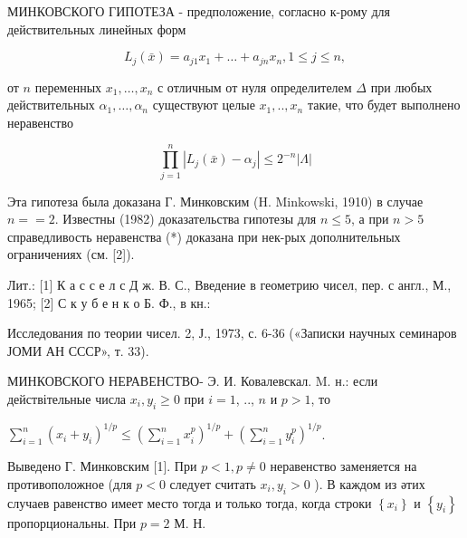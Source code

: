 \documentclass[10pt]{article}
\begin{document}
МИНКОВСКОГО ГИПОТЕЗА - предположение, согласно к-рому для действительных линейных форм



\[

L_{j}(\bar{x})=a_{j 1} x_{1}+\ldots+a_{j n} x_{n}, 1 \leqslant j \leqslant n,

\]



от $n$ переменных $x_{1}, \ldots, x_{n}$ с отличным от нуля определителем $\Delta$ при любых действительных $\alpha_{1}, \ldots, \alpha_{n}$ существуют целые $x_{1}, . ., x_{n}$ такие, что будет выполнено неравенство



\[

\prod_{j=1}^{n}\left|L_{j}(\bar{x})-\alpha_{j}\right| \leqslant 2^{-n}|\Lambda|

\]



Эта гипотеза была доказана Г. Минковским (H. Minkowski, 1910) в случае $n==2$. Известны (1982) доказательства гипотезы для $n \leqslant 5$, а при $n>5$ справедливость неравенства (*) доказана при нек-рых дополнительных ограничениях (см. [2]).



Лит.: [1] К а с с е л с Д ж. В. С., Введение в геометрию чисел, пер. с англ., М., 1965; [2] С к у б е н к о Б. Ф., в кн.:

Исследования по теории чисел. 2, Ј., 1973, с. 6-36 («Записки научных семинаров ЈОМИ АН СССР», т. 33).



МИНКОВСКОГО НЕРАВЕНСТВО- Э. И. Ковалевскал. M. н.: если действітельные числа $x_{i}, y_{i} \geqslant 0$ при $i=1$, .., $n$ и $p>1$, то



$\sum_{i=1}^{n}\left(x_{i}+y_{i}\right)^{1 / p} \leqslant\left(\sum_{i=1}^{n} x_{i}^{p}\right)^{1 / p}+\left(\sum_{i=1}^{n} y_{i}^{p}\right)^{1 / p}$.



Выведено Г. Минковским [1]. При $p<1, p \neq 0$ неравенство заменяется на противоположное (для $p<0$ следует считать $x_{i}, y_{i}>0$ ). В каждом из әтих случаев равенство имеет место тогда и только тогда, когда строки $\left\{x_{i}\right\}$ и $\left\{y_{i}\right\}$ пропорциональны. При $p=2$ М. Н.
\end{document}
